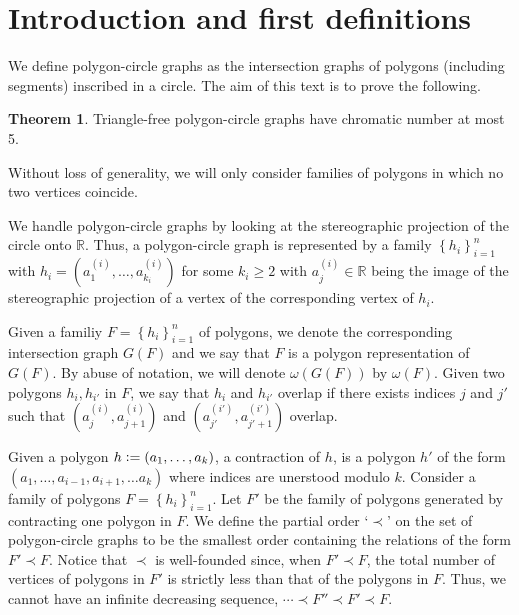 \documentclass[12pt]{article}
\theoremstyle{definition}
\newtheorem{thm}{Theorem}
\newcommand{\defeq}{\vcentcolon=}
\begin{document}
    \section{Introduction and first definitions}

    We define polygon-circle
    graphs as the intersection
    graphs of polygons
    (including segments)
    inscribed in a circle.
    The aim of this text is to
    prove the following.

    \begin{thm} \label{thm:main}
        Triangle-free
        polygon-circle graphs
        have chromatic number at
        most 5.
    \end{thm}

    Without loss of generality,
    we will only consider
    families of polygons
    in which no two
    vertices coincide.

    We handle polygon-circle graphs by looking
    at the stereographic projection
    of the circle onto $\mathbb{R}$.
    Thus, a polygon-circle
    graph is represented by a 
    family $\left\{h_{i}\right\}_{i=1}^{n}$
    with 
    $h_{i} = \left(a_{1}^{\left(i\right)},
    \ldots, a_{k_{i}}^{\left(i\right)}\right)$ 
    for some $k_{i} \geq 2$ 
    with $a^{\left(i\right)}_{j} \in \mathbb{R}$
    being the image of
    the stereographic projection
    of a vertex of
    the corresponding 
    vertex of $h_{i}$.

    Given a familiy
    $F = \left\{h_{i}\right\}_{i=1}^{n}$ 
    of polygons, we denote
    the corresponding
    intersection graph $G\left(F\right)$
    and we say that
    $F$ is a polygon
    representation
    of $G\left(F\right)$.
    By abuse of notation,
    we will denote
    $\omega\left(G\left(F\right)\right)$ 
    by $\omega\left(F\right)$.
    Given two polygons
    $h_{i}, h_{i'}$ in $F$,
    we say that $h_{i}$ and
    $h_{i'}$ overlap 
    if there exists indices 
    $j$ and $j'$ such that
    $\left(a_{j}^{\left(i\right)},
     a_{j+1}^{\left(i\right)}\right)$ 
     and $\left(a_{j'}^{\left(i'\right)},
     a_{j'+1}^{\left(i'\right)}\right)$ 
     overlap.

     Given a polygon
     $h \defeq \left(
     a_{1}, \ldots, a_{k}\right)$,
     a contraction of $h$,
     is a polygon $h'$ 
     of the form
     $\left(a_{1}, \ldots,
     a_{i-1}, a_{i+1}, \ldots
     a_{k}\right)$ 
     where indices are
     unerstood modulo $k$.
     Consider a family of
     polygons
     $F = \left\{h_{i}\right\}_{i=1}^{n}$.
     Let $F'$ be the family
     of polygons generated
     by contracting one
     polygon in $F$.
     We define the partial order
     `$\prec$' on the set
     of polygon-circle graphs
     to be the smallest order
     containing
     the relations of the
     form $F' \prec F$.
     Notice that $\prec$ is
     well-founded since,
     when $F' \prec F$,
     the total number of 
     vertices of polygons in
     $F'$ is strictly less than
     that of the polygons in $F$.
     Thus, we cannot have an
     infinite decreasing sequence,
     $\cdots \prec F'' \prec F' \prec F$.
\end{document}
